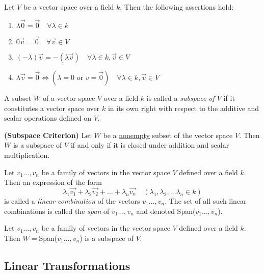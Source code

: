 \documentclass[a5paper]{article}
\begin{document}
\begin{proposition}
Let $V$ be a vector space over a field $k$. Then the following assertions hold:
\begin{enumerate}[label=(\roman*)]
\item $\lambda\vec{0}=\vec{0} \quad \forall \lambda \in k$
\item $0\vec{v}=\vec{0} \quad \forall \vec{v} \in V$
\item $(-\lambda)\vec{v}=-(\lambda\vec{v}) \quad \forall \lambda \in k, \vec{v} \in V$
\item $\lambda\vec{v}=\vec{0} \iff (\lambda=0 \text{ or } v=\vec{0}) \quad \forall \lambda \in k, \vec{v} \in V$
\end{enumerate}
\end{proposition}

\begin{definition*}
A subset $W$ of a vector space $V$ over a field $k$ is called a \emph{subspace of $V$} if it constitutes a vector space over $k$ in its own right with respect to the additive and scalar operations defined on $V$. 
\end{definition*}

\begin{proposition} \textbf{(Subspace Criterion)} Let $W$ be a \underline{nonempty} subset of the vector space $V$. Then $W$ is a subspace of $V$ if and only if it is closed under addition and scalar multiplication. 
\end{proposition}

\begin{definition*}
Let $v_1 \ldots, v_n$ be a family of vectors in the vector space $V$ defined over a field $k$. Then an expression of the form 
$$\lambda_1\vec{v_1} + \lambda_2\vec{v_2} + \ldots + \lambda_n\vec{v_n} \quad (\lambda_1, \lambda_2, \ldots \lambda_n \in k)$$
is called a \emph{linear combination} of the vectors $v_1 \ldots, v_n$. The set of all such linear
combinations is called the \emph{span} of $v_1 \ldots, v_n$ and denoted Span($v_1 \ldots, v_n$). 
\end{definition*}

\begin{proposition}
Let $v_1 \ldots, v_n$ be a family of vectors in the vector space $V$ defined over a field $k$. Then $W = $Span($v_1 \ldots, v_n$) is a subspace of $V$. 
\end{proposition}

\subsection{Linear Transformations}
\end{document}
